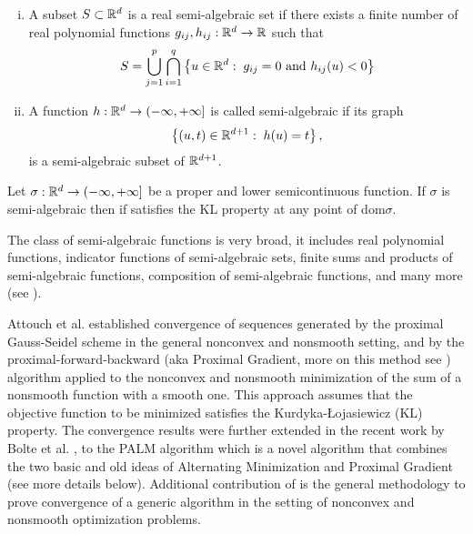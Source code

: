 \begin{definition} 
\begin{enumerate}[(i)]
	\item A subset $S \subset \mathbb{R}^d$ is a real semi-algebraic set if there exists a finite number of real polynomial functions $g_{ij}, h_{ij}: \mathbb{R}^d \rightarrow \mathbb{R}$ such that
	\begin{equation*}
		S = \bigcup\limits_{j=1}^{p} \bigcap\limits_{i=1}^{q} \left\lbrace u \in \mathbb{R}^d : \; g_{ij}=0 \text{ and } h_{ij}(u)<0 \right\rbrace
	\end{equation*}
	\item A function $h:\mathbb{R}^d \rightarrow (-\infty, +\infty]$ is called semi-algebraic if its graph
	\begin{equation*}
		\left\lbrace (u,t)\in\mathbb{R}^{d+1} : \; h(u)=t \right\rbrace ,
	\end{equation*}
	is a semi-algebraic subset of $\mathbb{R}^{d+1}$.
\end{enumerate}
\end{definition}

\begin{theorem} \label{SA_is_KL}
Let $\sigma:\mathbb{R}^d \rightarrow (-\infty, +\infty]$ be a proper and lower semicontinuous function. If $\sigma$ is semi-algebraic then if satisfies the KL property at any point of dom$\sigma$.
\end{theorem}
The class of semi-algebraic functions is very broad, it includes real polynomial functions, indicator functions of semi-algebraic sets, finite sums and products of semi-algebraic functions, composition of semi-algebraic functions, and many more (see \cite{AB2009, ABS2013}).\medskip

Attouch et al. \cite{AB2009, ABS2013} established convergence of sequences generated by the proximal Gauss-Seidel scheme in the general nonconvex and nonsmooth setting, and by the proximal-forward-backward (aka Proximal Gradient, more on this method see \cite{LM1979,T1991,CR1997}) algorithm applied to the nonconvex and nonsmooth minimization of the sum of a nonsmooth function with a smooth one. This approach assumes that the objective function to be minimized satisfies the Kurdyka-{\L}ojasiewicz (KL) property. The convergence results were further extended in the recent work by Bolte et al. \cite{BST2014}, to the PALM algorithm which is a novel algorithm that combines the two basic and old ideas of Alternating Minimization and Proximal Gradient (see more details below). Additional contribution of \cite{BST2014} is the general methodology to prove convergence of a generic algorithm in the setting of nonconvex and nonsmooth optimization problems.\medskip

